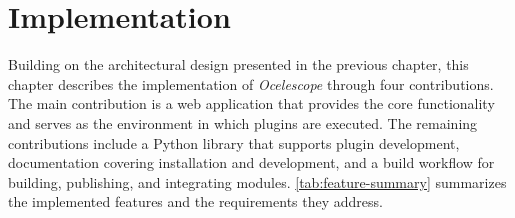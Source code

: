 \chapter{Implementation}
\label{chap:impl}

Building on the architectural design presented in the previous chapter, this chapter describes the implementation of \textit{Ocelescope} through four contributions.
The main contribution is a web application that provides the core functionality and serves as the environment in which plugins are executed.
The remaining contributions include a Python library that supports plugin development, documentation covering installation and development, and a build workflow for building, publishing, and integrating modules.
\autoref{tab:feature-summary} summarizes the implemented features and the requirements they address.

